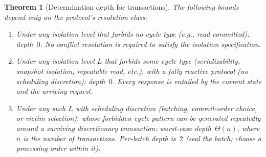 \documentclass[acmsmall,review,anonymous]{acmart}
\newtheorem{theorem}{Theorem}
\theoremstyle{remark}
\numberwithin{definition}{section}
\numberwithin{theorem}{section}
\numberwithin{lemma}{section}
\numberwithin{corollary}{section}
\numberwithin{remark}{section}
\numberwithin{example}{section}
\numberwithin{observation}{section}
\numberwithin{assumption}{section}
\begin{document}
\begin{theorem}[Determination depth for transactions]
  \label{thm:txn-depth}
  The following bounds depend only on the protocol's resolution class:
  \begin{enumerate}[nosep,label=(\alph*)]
    \item Under any isolation level that forbids no cycle type (e.g.,
          read committed): depth~$0$.
          No conflict resolution is required to satisfy the isolation
          specification.
    \item Under any isolation level $L$ that forbids some cycle type
          (serializability, snapshot isolation, repeatable read, etc.),
          with a fully reactive protocol (no scheduling discretion):
          depth~$0$.
          Every response is entailed by the current state and the
          arriving request.
    \item Under any such $L$ with scheduling discretion (batching,
          commit-order choice, or victim selection), whose forbidden
          cycle pattern can be generated repeatedly around a surviving
          discretionary transaction: worst-case
          depth~$\Theta(n)$, where $n$ is the number of transactions.
          Per-batch depth is~$2$ (seal the batch; choose a processing
          order within it).
  \end{enumerate}
\end{theorem}
\end{document}
